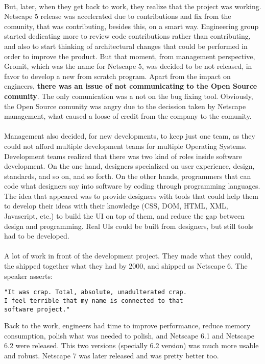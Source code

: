 \documentclass[11pt]{article}
\begin{document}
\\
But, later, when they get back to work, they realize that the project was working. Netscape 5 release was accelerated due to contributions and fix from the comunity, that was contributing, besides this, on a smart way. Engineering group started dedicating more to review code contributions rather than contributing, and also to start thinking of architectural changes that could be performed in order to improve the product. But that moment, from management perspective, Gromit, which was the name for Netscape 5, was decided to be not released, in favor to develop a new from scratch program. Apart from the impact on engineers, \textbf{there was an issue of not communicating to the Open Source comunity}. The only comunication was a not on the bug fixing tool. Obviously, the Open Source comunity was angry due to the decission taken by Netscape management, what caused a loose of credit from the company to the comunity.\\
\\
Management also decided, for new developments, to keep just one team, as they could not afford multiple development teams for multiple Operating Systems. Development teams realized that there was two kind of roles inside software development. On the one hand, designers specialized on user experience, design, standards, and so on, and so forth. On the other hands, programmers that can code what designers say into software by coding through programming languages. The idea that appeared was to provide designers with tools that could help them to develop their ideas with their knowledge (CSS, DOM, HTML, XML, Javascript, etc.) to build the UI on top of them, and reduce the gap between design and programming. Real UIs could be built from designers, but still tools had to be developed.\\
\\
A lot of work in front of the development project. They made what they could, the shipped together what they had by 2000, and shipped as Netscape 6. The speaker asserts:
\begin{verbatim}
"It was crap. Total, absolute, unadulterated crap.
I feel terrible that my name is connected to that
software project."
\end{verbatim}
Back to the work, engineers had time to improve performance, reduce memory consumption, polish what was needed to polish, and Netscape 6.1 and Netscape 6.2 were released. This two versions (specially 6.2 version) was much more usable and robust. Netscape 7 was later released and was pretty better too.\\
\\
\end{document}
